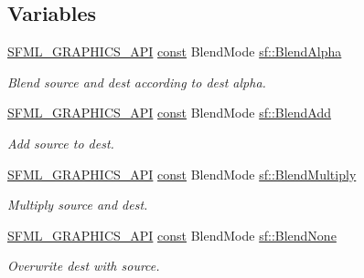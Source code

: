 \subsection*{Variables}
\begin{DoxyCompactItemize}
\item 
\hyperlink{sfml_2dep_2_s_f_m_l-2_84_82_2include_2_s_f_m_l_2_graphics_2_export_8hpp_ab84c9f1035e146917de3bc0f98d72b35}{S\-F\-M\-L\-\_\-\-G\-R\-A\-P\-H\-I\-C\-S\-\_\-\-A\-P\-I} \hyperlink{term__entry_8h_a57bd63ce7f9a353488880e3de6692d5a}{const} Blend\-Mode \hyperlink{namespacesf_a7747d95d2e1f108142ea7c760c0b266c}{sf\-::\-Blend\-Alpha}
\begin{DoxyCompactList}\small\item\em Blend source and dest according to dest alpha. \end{DoxyCompactList}\item 
\hyperlink{sfml_2dep_2_s_f_m_l-2_84_82_2include_2_s_f_m_l_2_graphics_2_export_8hpp_ab84c9f1035e146917de3bc0f98d72b35}{S\-F\-M\-L\-\_\-\-G\-R\-A\-P\-H\-I\-C\-S\-\_\-\-A\-P\-I} \hyperlink{term__entry_8h_a57bd63ce7f9a353488880e3de6692d5a}{const} Blend\-Mode \hyperlink{namespacesf_a1be8c314242e6ed161af2aea08be543c}{sf\-::\-Blend\-Add}
\begin{DoxyCompactList}\small\item\em Add source to dest. \end{DoxyCompactList}\item 
\hyperlink{sfml_2dep_2_s_f_m_l-2_84_82_2include_2_s_f_m_l_2_graphics_2_export_8hpp_ab84c9f1035e146917de3bc0f98d72b35}{S\-F\-M\-L\-\_\-\-G\-R\-A\-P\-H\-I\-C\-S\-\_\-\-A\-P\-I} \hyperlink{term__entry_8h_a57bd63ce7f9a353488880e3de6692d5a}{const} Blend\-Mode \hyperlink{namespacesf_ad8622674d06322d447de6ea0c95c83b4}{sf\-::\-Blend\-Multiply}
\begin{DoxyCompactList}\small\item\em Multiply source and dest. \end{DoxyCompactList}\item 
\hyperlink{sfml_2dep_2_s_f_m_l-2_84_82_2include_2_s_f_m_l_2_graphics_2_export_8hpp_ab84c9f1035e146917de3bc0f98d72b35}{S\-F\-M\-L\-\_\-\-G\-R\-A\-P\-H\-I\-C\-S\-\_\-\-A\-P\-I} \hyperlink{term__entry_8h_a57bd63ce7f9a353488880e3de6692d5a}{const} Blend\-Mode \hyperlink{namespacesf_aaa5511bd6fcf3573d61945b6d70a20ab}{sf\-::\-Blend\-None}
\begin{DoxyCompactList}\small\item\em Overwrite dest with source. \end{DoxyCompactList}\end{DoxyCompactItemize}
